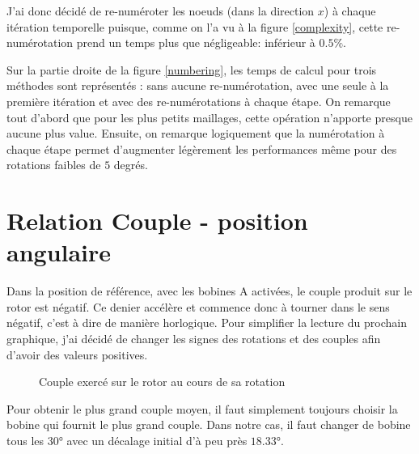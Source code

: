 \documentclass[11 pt]{article}
\begin{document}
J'ai donc décidé de re-numéroter les noeuds (dans la direction $x$) à chaque itération temporelle puisque, comme on l'a vu à la figure \ref{complexity}, cette re-numérotation prend un temps plus que négligeable: inférieur à $0.5 \%$.

Sur la partie droite de la figure \ref{numbering}, les temps de calcul pour trois méthodes sont représentés : sans aucune re-numérotation, avec une seule à la première itération et avec des re-numérotations à chaque étape. On remarque tout d'abord que pour les plus petits maillages, cette opération n'apporte presque aucune plus value. Ensuite, on remarque logiquement que la numérotation à chaque étape permet d'augmenter légèrement les performances même pour des rotations faibles de $5$ degrés.

\section{Relation Couple - position angulaire}
\vspace{-0.3cm}
Dans la position de référence, avec les bobines A activées, le couple produit sur le rotor est négatif. Ce denier accélère et commence donc à tourner dans le sens négatif, c'est à dire de manière horlogique. Pour simplifier la lecture du prochain graphique, j'ai décidé de changer les signes des rotations et des couples afin d'avoir des valeurs positives.

\begin{figure}[!h]
    \centering
    
    \caption{Couple exercé sur le rotor au cours de sa rotation}
    \label{torque}
\end{figure}

Pour obtenir le plus grand couple moyen, il faut simplement toujours choisir la bobine qui fournit le plus grand couple. Dans notre cas, il faut changer de bobine tous les $30$° avec un décalage initial d'à peu près $18.33$°.

\nocite{*}
\printbibliography

\newpage
\end{document}
